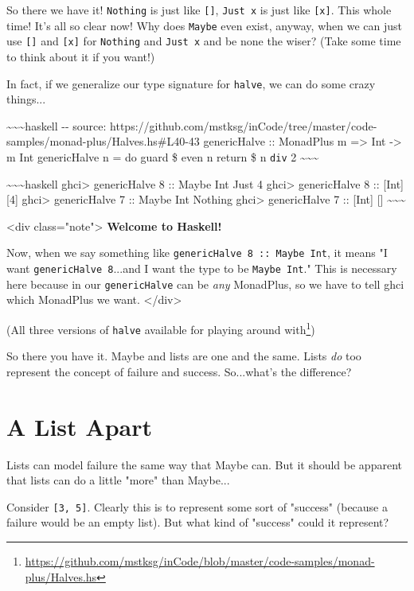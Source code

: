\documentclass[]{article}
\renewcommand{\href}[2]{#2\footnote{\url{#1}}}
\begin{document}
So there we have it! \texttt{Nothing} is just like \texttt{{[}{]}},
\texttt{Just\ x} is just like \texttt{{[}x{]}}. This whole time! It's all so
clear now! Why does \texttt{Maybe} even exist, anyway, when we can just use
\texttt{{[}{]}} and \texttt{{[}x{]}} for \texttt{Nothing} and \texttt{Just\ x}
and be none the wiser? (Take some time to think about it if you want!)

In fact, if we generalize our type signature for \texttt{halve}, we can do some
crazy things...

\textasciitilde{}\textasciitilde{}\textasciitilde{}haskell -\/- source:
https://github.com/mstksg/inCode/tree/master/code-samples/monad-plus/Halves.hs\#L40-43
genericHalve :: MonadPlus m =\textgreater{} Int -\textgreater{} m Int
genericHalve n = do guard \$ even n return \$ n \texttt{div} 2
\textasciitilde{}\textasciitilde{}\textasciitilde{}

\textasciitilde{}\textasciitilde{}\textasciitilde{}haskell ghci\textgreater{}
genericHalve 8 :: Maybe Int Just 4 ghci\textgreater{} genericHalve 8 ::
{[}Int{]} {[}4{]} ghci\textgreater{} genericHalve 7 :: Maybe Int Nothing
ghci\textgreater{} genericHalve 7 :: {[}Int{]} {[}{]}
\textasciitilde{}\textasciitilde{}\textasciitilde{}

\textless{}div class="note"\textgreater{} \textbf{Welcome to Haskell!}

Now, when we say something like \texttt{genericHalve\ 8\ ::\ Maybe\ Int}, it
means "I want \texttt{genericHalve\ 8}...and I want the type to be
\texttt{Maybe\ Int}." This is necessary here because in our
\texttt{genericHalve} can be \emph{any} MonadPlus, so we have to tell ghci which
MonadPlus we want. \textless{}/div\textgreater{}

(\href{https://github.com/mstksg/inCode/blob/master/code-samples/monad-plus/Halves.hs}{All
three versions of \texttt{halve} available for playing around with})

So there you have it. Maybe and lists are one and the same. Lists \emph{do} too
represent the concept of failure and success. So...what's the difference?

\section{A List Apart}

Lists can model failure the same way that Maybe can. But it should be apparent
that lists can do a little "more" than Maybe...

Consider \texttt{{[}3,\ 5{]}}. Clearly this is to represent some sort of
"success" (because a failure would be an empty list). But what kind of "success"
could it represent?
\end{document}
